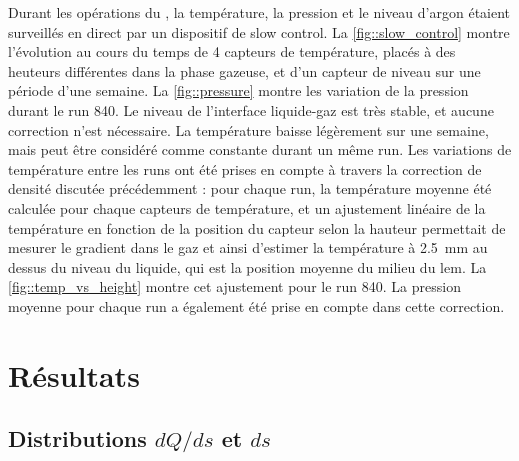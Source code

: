       Durant les opérations du \TOO{}, la température, la pression et le niveau d'argon étaient surveillés en direct par un dispositif de slow control. La \autoref{fig::slow_control} montre l'évolution au cours du temps de 4 capteurs de température, placés à des heuteurs différentes dans la phase gazeuse, et d'un capteur de niveau sur une période d'une semaine. La \autoref{fig::pressure} montre les variation de la pression durant le run 840. Le niveau de l'interface liquide-gaz est très stable, et aucune correction n'est nécessaire. La température baisse légèrement sur une semaine, mais peut être considéré comme constante durant un même run. Les variations de température entre les runs ont été prises en compte à travers la correction de densité discutée précédemment : pour chaque run, la température moyenne été calculée pour chaque capteurs de température, et un ajustement linéaire de la température en fonction de la position du capteur selon la hauteur permettait de mesurer le gradient dans le gaz et ainsi d'estimer la température à \SI{2.5}{\milli\meter} au dessus du niveau du liquide, qui est la position moyenne du milieu du \gls{lem}. La \autoref{fig::temp_vs_height} montre cet ajustement pour le run 840. La pression moyenne pour chaque run a également été prise en compte dans cette correction.

  \section{Résultats}\label{sec::results-311}

    \subsection{Distributions $dQ/ds$ et $ds$}


